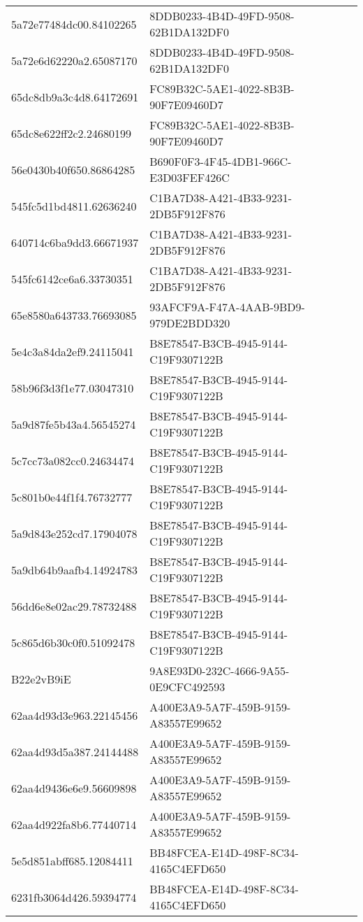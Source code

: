 \begin{tabular}{ll}
5a72e77484dc00.84102265 & 8DDB0233-4B4D-49FD-9508-62B1DA132DF0 \\
5a72e6d62220a2.65087170 & 8DDB0233-4B4D-49FD-9508-62B1DA132DF0 \\
65dc8db9a3c4d8.64172691 & FC89B32C-5AE1-4022-8B3B-90F7E09460D7 \\
65dc8e622ff2c2.24680199 & FC89B32C-5AE1-4022-8B3B-90F7E09460D7 \\
56e0430b40f650.86864285 & B690F0F3-4F45-4DB1-966C-E3D03FEF426C \\
545fc5d1bd4811.62636240 & C1BA7D38-A421-4B33-9231-2DB5F912F876 \\
640714c6ba9dd3.66671937 & C1BA7D38-A421-4B33-9231-2DB5F912F876 \\
545fc6142ce6a6.33730351 & C1BA7D38-A421-4B33-9231-2DB5F912F876 \\
65e8580a643733.76693085 & 93AFCF9A-F47A-4AAB-9BD9-979DE2BDD320 \\
5e4c3a84da2ef9.24115041 & B8E78547-B3CB-4945-9144-C19F9307122B \\
58b96f3d3f1e77.03047310 & B8E78547-B3CB-4945-9144-C19F9307122B \\
5a9d87fe5b43a4.56545274 & B8E78547-B3CB-4945-9144-C19F9307122B \\
5c7cc73a082cc0.24634474 & B8E78547-B3CB-4945-9144-C19F9307122B \\
5c801b0e44f1f4.76732777 & B8E78547-B3CB-4945-9144-C19F9307122B \\
5a9d843e252cd7.17904078 & B8E78547-B3CB-4945-9144-C19F9307122B \\
5a9db64b9aafb4.14924783 & B8E78547-B3CB-4945-9144-C19F9307122B \\
56dd6e8e02ac29.78732488 & B8E78547-B3CB-4945-9144-C19F9307122B \\
5c865d6b30c0f0.51092478 & B8E78547-B3CB-4945-9144-C19F9307122B \\
B22e2vB9iE & 9A8E93D0-232C-4666-9A55-0E9CFC492593 \\
62aa4d93d3e963.22145456 & A400E3A9-5A7F-459B-9159-A83557E99652 \\
62aa4d93d5a387.24144488 & A400E3A9-5A7F-459B-9159-A83557E99652 \\
62aa4d9436e6e9.56609898 & A400E3A9-5A7F-459B-9159-A83557E99652 \\
62aa4d922fa8b6.77440714 & A400E3A9-5A7F-459B-9159-A83557E99652 \\
5e5d851abff685.12084411 & BB48FCEA-E14D-498F-8C34-4165C4EFD650 \\
6231fb3064d426.59394774 & BB48FCEA-E14D-498F-8C34-4165C4EFD650 \\

\end{tabular}
